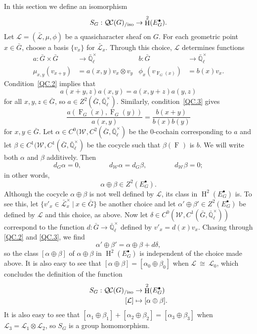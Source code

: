 \documentclass[10pt]{amsart}
\theoremstyle{plain}
\theoremstyle{definition}
\theoremstyle{remark}
\newcommand{\EE}{\mathbb{\bar Q}_\ell}
\newcommand{\EEx}{\EE^\times}
\newcommand{\Weil}[1]{\mathcal{W}_{#1}}
\newcommand{\Frob}[1]{\operatorname{F}_{#1}}
\DeclareMathOperator{\Hh}{H}
\newcommand{\tq}{{\ \vert\ }}
\newcommand{\iso}{{\ \cong\ }}
\newcommand{\qcs}[1]{{\mathcal{#1}}}
\newcommand{\gqcs}[1]{{\mathcal{\bar #1}}}
\newcommand{\QC}{{\mathcal{Q\hskip-0.8pt C}}}
\newcommand{\QCiso}[1]{\QC(#1)_{/\text{iso}}}
\begin{document}
In this section we define an isomorphism
\[
S_G : \QCiso{G} \to \Hh^2(E^\bullet_G).
\]
Let $\qcs{L} = (\gqcs{L},\mu,\phi)$ be a quasicharacter sheaf on $G$.
For each geometric point $x\in {\bar G}$, choose a basis $\{ v_x \}$ for $\gqcs{L}_x$.
Through this choice, $\qcs{L}$ determines functions
\begin{align*}
a : {\bar G}\times {\bar G} &\to \EEx & b : {\bar G} &\to \EEx \\
\mu_{x,y}(v_{x+y}) &= a(x,y) v_x \otimes v_y & \phi_x(v_{\Frob{G}(x)}) &= b(x) v_x.
\end{align*}
Condition~\ref{QC.2} implies that
\begin{equation}\label{2-cocyle}
a(x+y,z) a(x,y) = a(x,y+z) a(y,z)
\end{equation}
for all $x,y,z\in {\bar G}$, so $a \in Z^2({\bar G},\EEx)$.  Similarly, condition~\ref{QC.3} gives
\begin{equation}\label{nohom}
\frac{a(\Frob{G}(x),\Frob{G}(y))}{a(x,y)} =  \frac{b(x+y)}{b(x) b(y)}
\end{equation}
for $x, y \in {\bar G}$.
Let $\alpha \in C^0(\Weil{},C^2({\bar G},\EEx)$ be the $0$-cochain corresponding to $a$ and let $\beta\in C^1(\Weil{},C^1({\bar G},\EEx)$ be the cocycle such that $\beta(\Frob{})$ is $b$.  We will write both $\alpha$ and $\beta$ additively.
Then
\[
d_G\alpha =0, \qquad\qquad
d_{\Weil{}} \alpha = d_{G} \beta,\qquad\qquad
d_{\Weil{}} \beta =0;
\]
in other words,
\[\alpha\oplus \beta \in Z^2(E^\bullet_G).\]
Although the cocycle $\alpha\oplus \beta$ is not well defined by $\qcs{L}$, its class in $\Hh^2(E^\bullet_G)$ is.
To see this, let $\{ v'_x \in \gqcs{L}_x^\times \tq x \in {\bar G}\}$ be another choice and let $\alpha'\oplus \beta' \in Z^2(E^\bullet_G)$ be defined by $\qcs{L}$ and this choice, as above.
Now let $\delta \in C^0(\Weil{},C^1({\bar G},\EEx))$ correspond to the function $d : {\bar G}\to \EEx$ defined by $v'_x = d(x) v_x$.
Chasing through \ref{QC.2} and \ref{QC.3}, we find
\[
\alpha'\oplus\beta' = \alpha\oplus\beta + d\delta,
\]
so the class $[\alpha\oplus\beta]$ of $\alpha\oplus\beta$ in $\Hh^2(E^\bullet_G)$ is independent of the choice made above. It is also easy to see that $[\alpha\oplus\beta] = [\alpha_0\oplus\beta_0]$ when $\qcs{L} \iso \qcs{L}_0$,
which concludes the definition of the function
\begin{align*}
S_G : \QCiso{G} &\to \Hh^2(E^\bullet_G)\\
[\qcs{L}] &\mapsto [\alpha\oplus \beta].
\end{align*}
It is also easy to see that $[\alpha_1\oplus\beta_1] + [\alpha_2\oplus\beta_2] = [\alpha_3\oplus\beta_3]$ when $\qcs{L}_3 = \qcs{L}_1\otimes \qcs{L}_2$, so $S_G$ is a group homomorphism.
\end{document}
